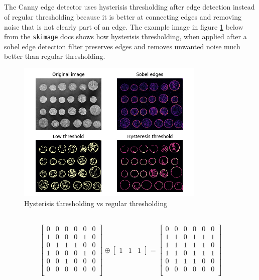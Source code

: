 \documentclass[]{article}
\begin{document}
\subsection{}
The Canny edge detector uses hysterisis thresholding after edge detection instead of regular thresholding because it is better at connecting edges and removing noise that is not clearly part of an edge. The example image in figure \ref{fig:hysterisis_skimage} below from the \texttt{skimage} docs shows how hysterisis thresholding, when applied after a sobel edge detection filter preserves edges and removes unwanted noise much better than regular thresholding.

\begin{figure}[H]
\centering
\includegraphics[width=0.8\textwidth]{hysterisis_skimage}
\caption{Hysterisis thresholding vs regular thresholding}
\label{fig:hysterisis_skimage}
\end{figure}

\subsection{}
\begin{equation}\begin{aligned}
\begin{bmatrix}
0 & 0 & 0 & 0 & 0 & 0 \\
1 & 0 & 0 & 0 & 1 & 0 \\
0 & 1 & 1 & 1 & 0 & 0 \\
1 & 0 & 0 & 0 & 1 & 0 \\
0 & 0 & 1 & 0 & 0 & 0 \\
0 & 0 & 0 & 0 & 0 & 0 \\
\end{bmatrix}
\oplus
\begin{bmatrix} 1 & 1 & 1 \end{bmatrix} =
\begin{bmatrix}
0 & 0 & 0 & 0 & 0 & 0 \\
1 & 1 & 0 & 1 & 1 & 1 \\
1 & 1 & 1 & 1 & 1 & 0 \\
1 & 1 & 0 & 1 & 1 & 1 \\
0 & 1 & 1 & 1 & 0 & 0 \\
0 & 0 & 0 & 0 & 0 & 0 \\
\end{bmatrix}
\end{aligned}\end{equation}
\end{document}
